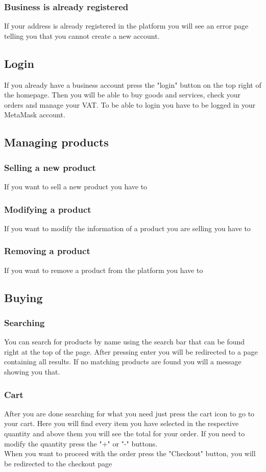 	\subsubsection{Business is already registered}
	If your address is already registered in the platform you will see an
	error page telling you that you cannot create a new account.
	\subsection{Login}
	If you already have a business account press the "login" button on the 
	top right of the homepage. Then you will be able to buy goods and services, 
	check your orders and manage your VAT. To be able to login you have to be 
	logged in your MetaMask account.
	\subsection{Managing products}
	\subsubsection{Selling a new product}
	If you want to sell a new product you have to
	
	\subsubsection{Modifying a product}
	If you want to modify the information of a product you are selling you 
	have to 
	\subsubsection{Removing a product}
	If you want to remove a product from the platform you have to
	
	\subsection{Buying}
	\subsubsection{Searching}
	You can search for products by name using the search bar that can be found 
	right at the top of the page. After pressing enter you will be redirected to
	a page containing all results. If no matching products are found you will 
	a message showing you that.
	\subsubsection{Cart}
	After you are done searching for what you need just press the cart icon to
	go to your cart. Here you will find every item you have selected in the 
	respective quantity and above them you will see the total for your order.
	If you need to modify the quantity press the "+" or "-" buttons. \\
	When you want to proceed with the order press the "Checkout" button, 
	you will be redirected to the checkout page
